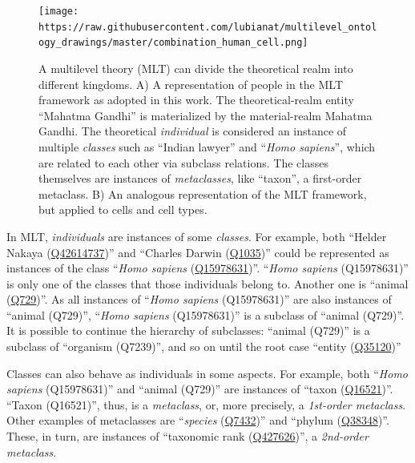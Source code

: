 \begin{figure}
\hypertarget{fig:multilevel}{%
\centering
\texttt{[image: https://raw.githubusercontent.com/lubianat/multilevel\_ontology\_drawings/master/combination\_human\_cell.png]}
\caption{A multilevel theory (MLT) can divide the theoretical realm into different kingdoms. A) A representation of people in the MLT framework as adopted in this work. The theoretical-realm entity ``Mahatma Gandhi'' is materialized by the material-realm Mahatma Gandhi. The theoretical \emph{individual} is considered an instance of multiple \emph{classes} such as ``Indian lawyer'' and ``\emph{Homo sapiens}'', which are related to each other via subclass relations. The classes themselves are instances of \emph{metaclasses}, like ``taxon'', a first-order metaclass. B) An analogous representation of the MLT framework, but applied to cells and cell types.}\label{fig:multilevel}
}
\end{figure}

In MLT, \emph{individuals} are instances of some \emph{classes}.
For example, both ``Helder Nakaya (\href{https://www.wikidata.org/wiki/Q42614737}{Q42614737})'' and ``Charles Darwin (\href{https://www.wikidata.org/wiki/Q42614737}{Q1035})'' could be represented as instances of the class ``\emph{Homo sapiens} (\href{https://www.wikidata.org/wiki/Q15978631}{Q15978631})''.
``\emph{Homo sapiens} (Q15978631)'' is only one of the classes that those individuals belong to.
Another one is ``animal (\href{https://www.wikidata.org/wiki/Q729}{Q729})''.
As all instances of ``\emph{Homo sapiens} (Q15978631)'' are also instances of ``animal (Q729)'', ``\emph{Homo sapiens} (Q15978631)'' is a subclass of ``animal (Q729)''.
It is possible to continue the hierarchy of subclasses: ``animal (Q729)'' is a subclass of ``organism (Q7239)'', and so on until the root case ``entity (\href{https://www.wikidata.org/wiki/Q35120}{Q35120})''

Classes can also behave as individuals in some aspects.
For example, both ``\emph{Homo sapiens} (Q15978631)'' and ``animal (Q729)'' are instances of ``taxon (\href{https://www.wikidata.org/wiki/Q16521}{Q16521})''.
``Taxon (Q16521)'', thus, is a \emph{metaclass}, or, more precisely, a \emph{1st-order metaclass}.
Other examples of metaclasses are ``\emph{species} (\href{https://www.wikidata.org/wiki/Q7432}{Q7432})'' and ``phylum (\href{https://www.wikidata.org/wiki/Q38348}{Q38348})''.
These, in turn, are instances of ``taxonomic rank (\href{https://www.wikidata.org/wiki/Q427626}{Q427626})'', a \emph{2nd-order metaclass}.

